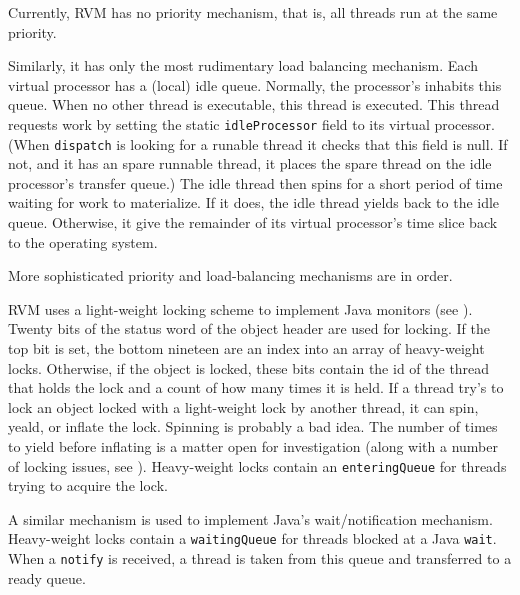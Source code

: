 Currently, RVM has no priority mechanism, that is, all threads run
at the same priority.

Similarly, it has only the most rudimentary load balancing mechanism.
Each virtual processor has a (local) idle queue.  Normally, the
processor's \VMIdleThreadURL inhabits this queue.  When no other
thread is executable, this thread is executed.  This thread requests
work by setting the static {\tt idleProcessor} field to its virtual
processor.  (When {\tt dispatch} is looking for a runable thread it
checks that this field is null.  If not, and it has an spare runnable
thread, it places the spare thread on the idle processor's transfer
queue.)  The idle thread then spins for a short period of time waiting
for work to materialize.  If it does, the idle thread yields back to
the idle queue.  Otherwise, it give the remainder of its virtual
processor's time slice back to the operating system.

More sophisticated priority and load-balancing mechanisms are in
order.

RVM uses a light-weight locking scheme to implement Java monitors (see
\VMLockURL).  Twenty bits of the status word of the object header are
used for locking.  If the top bit is set, the bottom nineteen are an
index into an array of heavy-weight locks.  Otherwise, if the object
is locked, these bits contain the id of the thread that holds the lock
and a count of how many times it is held.  If a thread try's to lock
an object locked with a light-weight lock by another thread, it can
spin, yeald, or inflate the lock.  Spinning is probably a bad idea.
The number of times to yield before inflating is a matter open for
investigation (along with a number of locking issues, see \VMLockURL).
Heavy-weight locks contain an {\tt enteringQueue} for threads trying
to acquire the lock.

A similar mechanism is used to implement Java's wait/notification
mechanism.  Heavy-weight locks contain a {\tt waitingQueue} for
threads blocked at a Java {\tt wait}.  When a {\tt notify} is
received, a thread is taken from this queue and transferred to a ready
queue.

